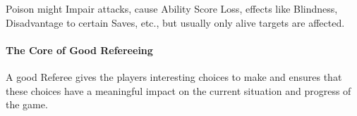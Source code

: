 \documentclass[itdr]{subfiles}
\begin{document}
Poison might Impair attacks, cause Ability Score Loss, effects like Blindness, Disadvantage to certain Saves, etc., but usually only alive targets are affected.

\paragraph{The Core of Good Refereeing}
A good Referee gives the players interesting choices to make and ensures that these choices have a meaningful impact on the current situation and progress of the game.
\end{document}
